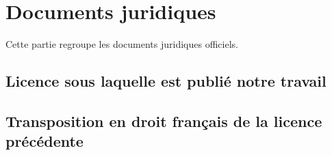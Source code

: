 \chapter{Documents juridiques}
\label{chap-juridique}

Cette partie regroupe les documents juridiques officiels.

\section{Licence sous laquelle est publié notre travail}
\label{sec-discours}

\lipsum[11-30]

\section{Transposition en droit français de la licence précédente}
\label{sec-autre-discours}

\lipsum[31-50]

